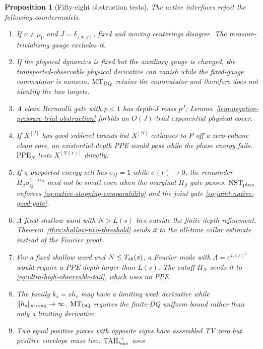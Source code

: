 \documentclass[11pt]{article}
\newtheorem{proposition}[theorem]{Proposition}
\begin{document}
\begin{proposition}[Fifty-eight obstruction tests]
\label{prop:v43-obstruction-tests}
The active interfaces reject the following countermodels.
\begin{enumerate}[label=\textup{(T\arabic*)}]
\item If $\nu\ne\mu_0$ and $J=\delta_{(x,y)}$, fixed and moving
      centerings disagree.  The measure-trivializing gauge excludes it.
\item If the physical dynamics is fixed but the auxiliary gauge is changed,
      the transported-observable physical derivative can vanish while the
      fixed-gauge commutator is nonzero.  $\mathrm{MT}_{\rm DQ}$ retains the
      commutator and therefore does not identify the two targets.
\item A clean Bernoulli gate with $p<1$ has depth-$J$ mass $p^J$;
      Lemma~\ref{lem:negative-pressure-trial-obstruction} forbids an
      $O(J)$-trial exponential physical cover.
\item If $X^{[J]}$ has good sublevel bounds but $X^{[N]}$ collapses to $P$
      off a zero-volume clean core, an existential-depth PPE would pass while
      the phase energy fails.  $\mathrm{PPE}_{N}$ tests $X^{[N(r)]}$
      directly.
\item If a purported energy cell has $\sigma_Q=1$ while
      $\sigma(r)\to0$, the remainder
      $H_\beta\sigma_Q^{1+\alpha_B}$ need not be small even when the
      marginal $H_\beta$ gate passes.  $\mathrm{NST}_{\rm phys}$ enforces
      \eqref{eq:native-stopping-comparability} and the joint gate
      \eqref{eq:joint-native-good-gate}.
\item A fixed shallow word with $N>L(s)$ lies outside the finite-depth
      refinement.  Theorem~\ref{thm:shallow-two-threshold} sends it to the
      all-time collar estimate instead of the Fourier proof.
\item For a fixed shallow word and $N\le T_{\rm sh}(s)$, a Fourier mode with
      $\Lambda=e^{L(s)^2}$ would require a PPE depth larger than $L(s)$.
      The cutoff $H_N$ sends it to
      \eqref{eq:ultra-high-observable-tail}, which uses no PPE.
\item The family $k_s=s h_s$ may have a limiting weak derivative while
      $\|h_s\|_{\rm strong}\to\infty$.  $\mathrm{MT}_{\rm DQ}$
      requires the finite-DQ uniform bound rather than only a limiting
      derivative.
\item Two equal positive pieces with opposite signs have assembled TV zero
      but positive envelope mass two.  $\mathrm{TAIL}_{\rm env}^{+}$ uses

\end{enumerate}
\end{proposition}
\end{document}
